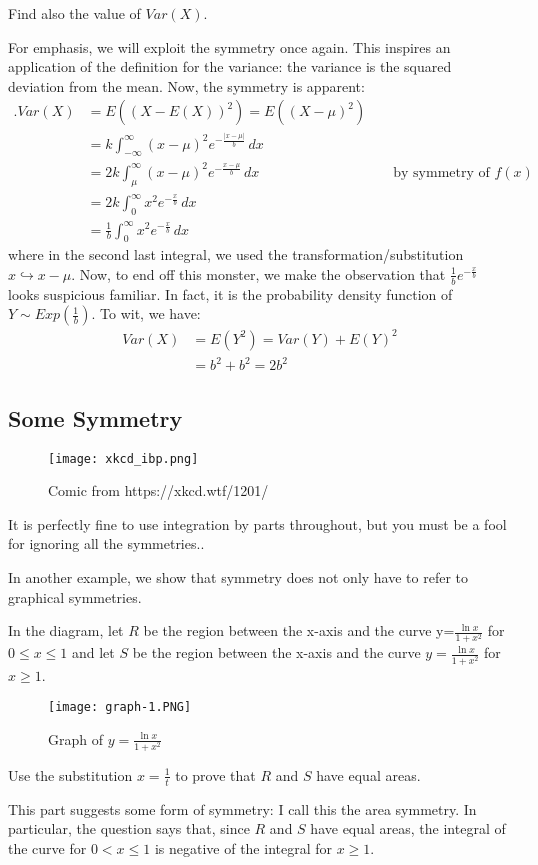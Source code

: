 \documentclass[../jarvis.tex]{subfiles}
\begin{document}
\begin{example}[cont..]
Find also the value of $Var(X).$
\end{example}
For emphasis, we will exploit the symmetry once again. This inspires an application of the definition for the variance: the variance is the squared deviation from the mean. Now, the symmetry is apparent:
\begin{align*}.
    Var(X)&=E((X-E(X))^2)=E((X-\mu)^2) \\
    &=k\int_{-\infty}^{\infty}(x-\mu)^2e^{-\frac{|x-\mu|}{b}} \,dx\\
    &=2k\int_{\mu}^{\infty}(x-\mu)^2e^{-\frac{x-\mu}{b}} \,dx &&\text{ by symmetry of $f(x)$} \\
    &=2k\int_{0}^{\infty}x^2e^{-\frac{x}{b}} \,dx\\
    &=\frac{1}{b}\int_{0}^{\infty}x^2e^{-\frac{x}{b}} \,dx
\end{align*}
where in the second last integral, we used the transformation/substitution $x\hookrightarrow x-\mu$.
Now, to end off this monster, we make the observation that $\frac{1}{b}e^{-\frac{x}{b}}$ looks suspicious familiar. In fact, it is the probability density function of $Y \sim Exp(\frac{1}{b})$. To wit, we have:
\begin{align*}
    Var(X)&=E(Y^2)=Var(Y)+E(Y)^2\\
    &=b^2+b^2=2b^2
\end{align*}
\subsection{Some Symmetry}
\begin{figure}[H]
    \centering
    \texttt{[image: xkcd\_ibp.png]}
    \caption{Comic from https://xkcd.wtf/1201/}
\end{figure}
\begin{moral}
It is perfectly fine to use integration by parts throughout, but you must be a fool for ignoring all the symmetries..
\end{moral}

In another example, we show that symmetry does not only have to refer to graphical symmetries.

\begin{example}[2021 H3 Math P1/1]
In the diagram, let $R$ be the region between the x-axis and the curve y=$\frac{\ln{x}}{1+x^2}$ for $0\leq x \leq 1$ and let $S$ be the region between the x-axis and the curve $y=\frac{\ln {x}}{1+x^2}$ for $x\geq 1$.
 \begin{figure}[H]
    \centering
    \texttt{[image: graph-1.PNG]}
    \caption{Graph of $y=\frac{\ln{x}}{1+x^2}$}
    \label{fig:1}
\end{figure}
Use the substitution $x=\frac{1}{t}$ to prove that $R$ and $S$ have equal areas.
\end{example}
This part suggests some form of symmetry: I call this the area symmetry. In particular, the question says that, since $R$ and $S$ have equal areas, the integral of the curve for $0 < x \leq 1$ is negative of the integral for $x \geq 1$.
\end{document}

